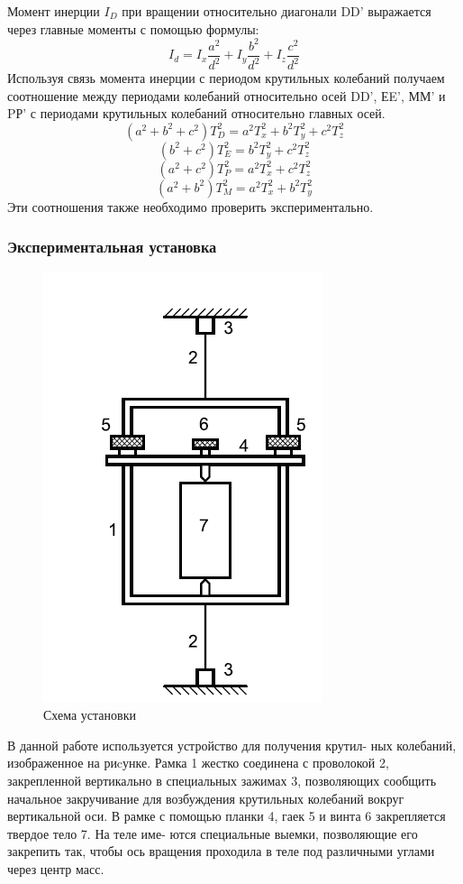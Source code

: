 \documentclass[a4paper,12pt]{article}
\begin{document}
Момент инерции $I_{D}$ при вращении относительно диагонали DD' выражается
 через главные моменты с помощью формулы:
\begin{equation}
    I_{d}=I_{x}\frac{a^2}{d^2}+I_{y}\frac{b^2}{d^2}+I_{z}\frac{c^2}{d^2}
\end{equation}
Используя связь момента инерции с периодом крутильных колебаний
получаем соотношение между периодами колебаний относительно осей DD', ЕE',
ММ' и PР' с периодами крутильных колебаний относительно главных осей.
$$(a^2+b^2+c^2)T^2_{D}=a^2 T^2_{x}+b^2 T^2_{y}+c^2 T^2_{z}$$
$$(b^2+c^2)T^2_{E}=b^2 T^2_{y}+c^2 T^2_{z}$$
$$(a^2+c^2)T^2_{P}=a^2 T^2_{x}+c^2 T^2_{z}$$
$$(a^2+b^2)T^2_{M}=a^2 T^2_{x}+b^2 T^2_{y}$$
Эти соотношения также необходимо проверить экспериментально.

\subsubsection*{Экспериментальная установка}

\begin{figure}[!h]
    \begin{center}
        \includegraphics[scale=1]{ystanovka}
        \caption{Схема установки}
        \label{graphic1}
    \end{center}
\end{figure}

В данной работе используется устройство для получения крутил-
ных колебаний, изображенное на риcунке. Рамка 1 жестко соединена
с проволокой 2, закрепленной вертикально в специальных зажимах
3, позволяющих сообщить начальное закручивание для возбуждения
крутильных колебаний вокруг вертикальной оси. В рамке с помощью
планки 4, гаек 5 и винта 6 закрепляется твердое тело 7. На теле име-
ются специальные выемки, позволяющие его закрепить так, чтобы ось
вращения проходила в теле под различными углами через центр масс.
\end{document}
